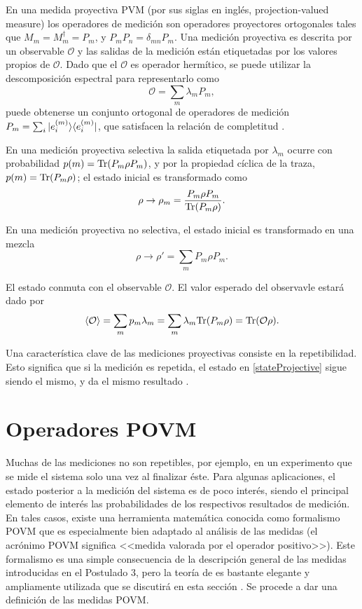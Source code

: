 En una medida proyectiva PVM (por sus siglas en inglés, projection-valued measure) los operadores de medición son operadores proyectores ortogonales  tales que $M_{m}=M_{m}^{\dagger}=P_{m}$, y $P_{m}P_{n}=\delta_{mn}P_{m}$. Una medición proyectiva es descrita por un observable $\mathcal{O}$ y las salidas de la medición están etiquetadas por los valores propios de $\mathcal{O}$. Dado que el $\mathcal{O}$ es operador hermítico, se puede utilizar la descomposición espectral para representarlo como 
\begin{equation}
	\mathcal{O}=\sum_m \lambda_m P_m ,
\end{equation}  puede obtenerse un conjunto ortogonal de operadores de medición $P_m=\sum_i |e_i^{(m)}\rangle \langle e_i^{(m)}|$, que satisfacen la relación de completitud {\cite{2007geometry}}. 



En una medición proyectiva selectiva la salida etiquetada por $\lambda_m$ ocurre con probabilidad $p(m)={\rm Tr}(P_m\rho P_m)$, y por la propiedad cíclica de la traza,  $p(m)={\rm Tr}(P_m\rho)$; el estado inicial es transformado como 
\begin{equation}\label{stateProjective}
	\rho\to	\rho_m=\dfrac{P_m\rho P_m}{{\rm Tr}(P_m \rho)}.
\end{equation}

 En una medición proyectiva no selectiva, el estado inicial es transformado en una mezcla  \begin{equation}
	\rho \to \rho'=\sum_m P_m \rho P_m.
\end{equation} 


El estado conmuta con el observable $\mathcal{O}$. El valor esperado del observavle estará dado por 
\begin{equation}
	\langle \mathcal{O} \rangle=\sum_m p_m\lambda_m=\sum_m \lambda_m {\rm Tr}(P_m\rho)={\rm Tr}(\mathcal{O}\rho).
\end{equation}

Una característica clave de las mediciones proyectivas consiste en la repetibilidad. Esto significa que si la medición es repetida, el estado en {\ref{stateProjective}} sigue siendo el mismo, y da el mismo resultado {\cite{2007geometry}}.

\section{Operadores POVM}\label{operadoresPOVM}

Muchas de las mediciones no son repetibles, por ejemplo, en un experimento que se mide el sistema solo una vez al finalizar éste. Para algunas aplicaciones, el estado posterior a la medición del sistema es de poco interés, siendo el principal elemento de interés las probabilidades de los respectivos resultados de medición. En tales casos, existe una herramienta matemática conocida como formalismo POVM que es especialmente bien adaptado al análisis de las medidas (el acrónimo POVM significa <<medida valorada por el operador positivo>>). Este formalismo es una simple consecuencia de la descripción general de las medidas introducidas en el Postulado 3, pero la teoría de es bastante elegante y ampliamente utilizada que se discutirá en esta sección {\cite{nielsen_chuang_2010}}. Se procede a dar una definición de las medidas POVM\@.

